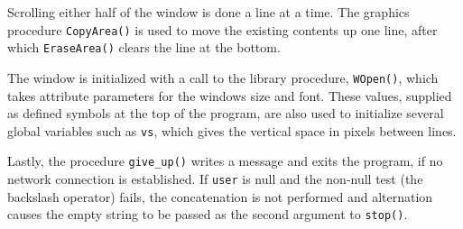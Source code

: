Scrolling either half of the window is done a line at a time. The
graphics procedure \texttt{CopyArea()} is used to move the existing
contents up one line, after which \texttt{EraseArea()} clears the line
at the bottom.


The window is initialized with a call to the library procedure,
\texttt{WOpen()}, which takes attribute
parameters for the window{\textquotesingle}s size and font. These
values, supplied as defined symbols at the top of the program, are also
used to initialize several global variables such as \texttt{vs}, which
gives the vertical space in pixels between lines.


Lastly, the procedure \texttt{give\_up()} writes a message and exits the
program, if no network connection is established. If \texttt{user} is
null and the non-null test (the backslash operator) fails, the
concatenation is not performed and alternation causes the empty string to be passed as the
second argument to \texttt{stop()}.


